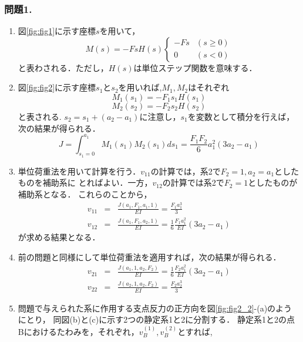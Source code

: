 \documentclass[10pt,a4j]{jarticle}
\begin{document}
\subsubsection*{問題1.}
\begin{enumerate}
\item
	図\ref{fig:fig1}に示す座標$s$を用いて，
	\begin{equation}
	M(s)=-FsH(s)\left\{
		\begin{array}{cc}
			-Fs & (s\geq 0) \\
			0 & (s<0)
		\end{array}
	\right.
	\label{eqn:}
	\end{equation}
	と表わされる．ただし，$H(s)$は単位ステップ関数を意味する．
\item
	図\ref{fig:fig2}に示す座標$s_1$と$s_2$を用いれば,$M_1,M_2$はそれぞれ
	\begin{equation}
		M_1(s_1)= -F_1s_1H(s_1)
	\end{equation}
	\begin{equation}
		M_2(s_2)= -F_2s_2H(s_2)
	\end{equation}
	と表される. $s_2=s_1+(a_2-a_1)$に注意し，$s_1$を変数として積分を行えば，
	次の結果が得られる．
	\begin{equation}
		J=\int_{s_1=0}^{a_1} M_1(s_1)M_2(s_1)ds_1=\frac{F_1F_2}{6}a_1^2(3a_2-a_1)
		\label{eqn:}
	\end{equation}
\item
	単位荷重法を用いて計算を行う．$v_{11}$の計算では，系2で$F_2=1,a_2=a_1$としたものを補助系に
	とればよい．一方，$v_{12}$の計算では系2で$F_2=1$としたものが補助系となる．
	これらのことから，
	\begin{eqnarray}
		v_{11}&=& \frac{J(a_1,F_1,a_1,1)}{EI}=\frac{F_1a_1^3}{3} \\
		v_{12}&=& \frac{J(a_1,F_1,a_2,1)}{EI}=\frac{1}{6}\frac{F_1a_1^2}{EI}(3a_2-a_1) 
	\end{eqnarray}
	が求める結果となる．
\item
	前の問題と同様にして単位荷重法を適用すれば，次の結果が得られる．
	\begin{eqnarray}
		v_{21}&=& \frac{J(a_1,1,a_2,F_2)}{EI}=\frac{1}{6}\frac{F_2a_1^2}{EI}(3a_2-a_1) \\
		v_{22}&=& \frac{J(a_2,1,a_2,F_2)}{EI}=\frac{F_2a_2^3}{3} 
	\end{eqnarray}
\item
	問題で与えられた系に作用する支点反力の正方向を図\ref{fig:fig2_2}-(a)のようにとり，
	同図(b)と(c)に示す2つの静定系1と2に分割する．
	静定系1と2の点Bにおけるたわみを，それぞれ，$v_B^{(1)},v_B^{(2)}$とすれば,

\end{enumerate}
\end{document}
